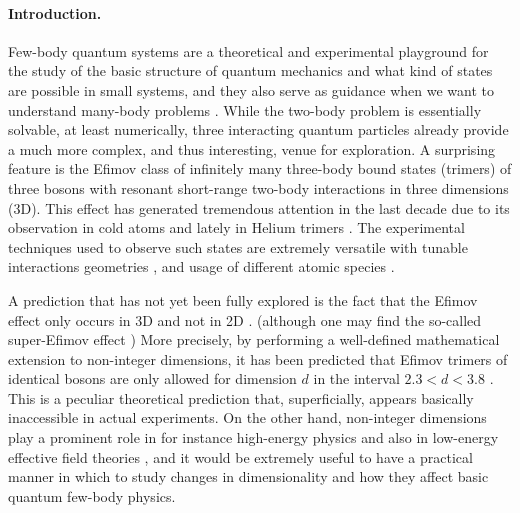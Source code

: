 \documentclass[twocolumn,showpacs,aps,prl,10pt]{revtex4}
\begin{document}
\paragraph*{Introduction.}
Few-body quantum systems are a theoretical 
and experimental playground for the study of 
the basic structure of quantum mechanics and 
what kind of states are possible in small systems, 
and they also serve as guidance when we want to 
understand many-body problems
\cite{greene-review2017,naidon-review2017,zinner2014,dincao2017}. 
While the 
two-body problem is essentially solvable, at 
least numerically, three interacting quantum 
particles already provide a much more complex, 
and thus interesting, venue for exploration. A 
surprising feature is the Efimov class \cite{efi70}
of infinitely many three-body bound states (trimers) of 
three bosons with resonant short-range two-body interactions in 
three dimensions (3D). This effect has generated tremendous
attention in the last decade due to its observation 
in cold atoms \cite{kraemer2006} 
and lately in Helium trimers \cite{dorner2015}. 
The experimental techniques used to observe such states
are extremely versatile with tunable interactions \cite{chin2010}
geometries \cite{bloch2008,deng2016}, and usage of different atomic 
species \cite{gross2009,knoop2009,zaccanti2009,williams2009,gross2010,lompe2010,nakajima2010,berninger2011,machtey2012,wild2012,knoop2012,roy2013,dyke2013,huang2014}. 



A prediction that has not yet been fully explored is the 
fact that the Efimov effect only occurs in 3D and not in 
2D \cite{bruch1979,nielsen1997,brodsky2006,kartavtsev2006,pricoupenko2010,helfrich2011,volosniev2013}. 
(although one may find the so-called super-Efimov effect \cite{nishida2013,volosniev2014,gao2015,efremov2014})
More precisely, 
by performing a well-defined mathematical extension to 
non-integer dimensions, it has been predicted that 
Efimov trimers of identical bosons are only allowed for dimension $d$ in 
the interval $2.3<d<3.8$ \cite{nie01}.
This is a peculiar theoretical prediction that, superficially, appears 
basically inaccessible in actual experiments. 
On the other hand, 
non-integer dimensions play a prominent role in 
for instance high-energy physics \cite{schroder1995} and 
also in low-energy effective field theories \cite{valiente2012}, 
and it would be extremely useful to have a
practical manner in which to study changes in dimensionality 
and how they affect basic quantum few-body physics. 
 
\end{document}

